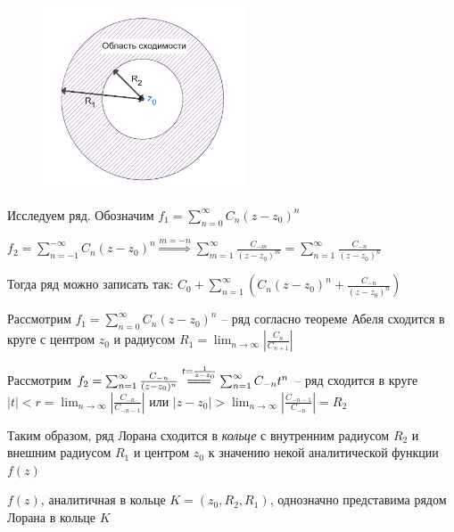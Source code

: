 \documentclass[12pt]{article}
\begin{document}

\begin{figure}
    \includegraphics[width=6cm]{addchapters2/images/addchapters2_2025_05_02_1}
\end{figure}

\Nota Исследуем ряд. Обозначим $f_1 = \sum_{n = 0}^\infty C_n (z - z_0)^n$

$f_2 = \sum_{n = -1}^{-\infty} C_n (z - z_0)^n \overset{m = -n}{\Longrightarrow} \sum_{m = 1}^\infty \frac{C_{-m}}{(z - z_0)^m} = \sum_{n = 1}^\infty \frac{C_{-n}}{(z - z_0)^n}$

Тогда ряд можно записать так: $C_0 + \sum_{n = 1}^\infty \left(C_n (z - z_0)^n + \frac{C_{-n}}{(z - z_0)^n}\right)$

Рассмотрим $f_1 = \sum_{n = 0}^\infty C_n (z - z_0)^n$ -- ряд согласно теореме Абеля сходится в круге с центром $z_0$ и радиусом $R_1 = \lim_{n \to \infty} \left|\frac{C_{n}}{C_{n+1}}\right|$

Рассмотрим $f_2 = \sum_{n = 1}^\infty \frac{C_{-n}}{(z - z_0)^n} \overset{t = \frac{1}{z - z_0}}{=\joinrel=\joinrel=} \sum_{n = 1}^\infty C_{-n} t^n$ -- ряд сходится в круге $|t| < r = \lim_{n \to \infty} \left|\frac{C_{-n}}{C_{-n-1}}\right|$ или $|z - z_0| > \lim_{n \to \infty} \left|\frac{C_{-n-1}}{C_{-n}}\right| = R_2$

Таким образом, ряд Лорана сходится в \textit{кольце} с внутренним радиусом $R_2$ и внешним радиусом $R_1$ и центром $z_0$ к значению некой аналитической функции $f(z)$


\begin{MyTheorem}
    $f(z)$, аналитичная в кольце $K = (z_0, R_2, R_1)$, однозначно представима рядом Лорана в кольце $K$
\end{MyTheorem}
\end{document}
